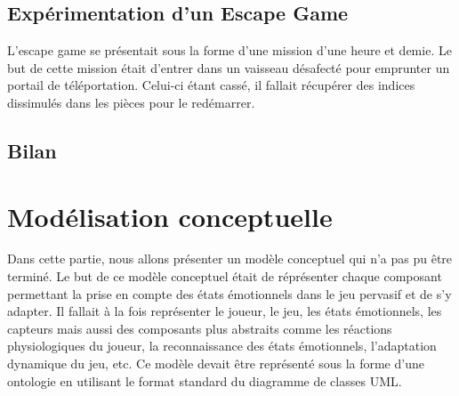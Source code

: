\documentclass{article}
\begin{document}
	\subsection{Expérimentation d'un Escape Game}\label{sec:expescape}
		L'escape game se présentait sous la forme d'une mission d'une heure et demie.
		Le but de cette mission était d'entrer dans un vaisseau désafecté pour emprunter un portail de téléportation.
		Celui-ci étant cassé, il fallait récupérer des indices dissimulés dans les pièces pour le redémarrer.
	\subsection{Bilan}

\section{Modélisation conceptuelle}\label{sec:modelisation}
	Dans cette partie, nous allons présenter un modèle conceptuel qui n'a pas pu être terminé. 
	Le but de ce modèle conceptuel était de réprésenter chaque composant permettant la prise en compte des états émotionnels dans le jeu pervasif et de s'y adapter. 
	Il fallait à la fois représenter le joueur, le jeu, les états émotionnels, les capteurs mais aussi des composants plus abstraits comme les réactions physiologiques du joueur, la reconnaissance des états émotionnels, l'adaptation dynamique du jeu, etc. 
	Ce modèle devait être représenté sous la forme d'une ontologie en utilisant le format standard du diagramme de classes UML.
\end{document}
